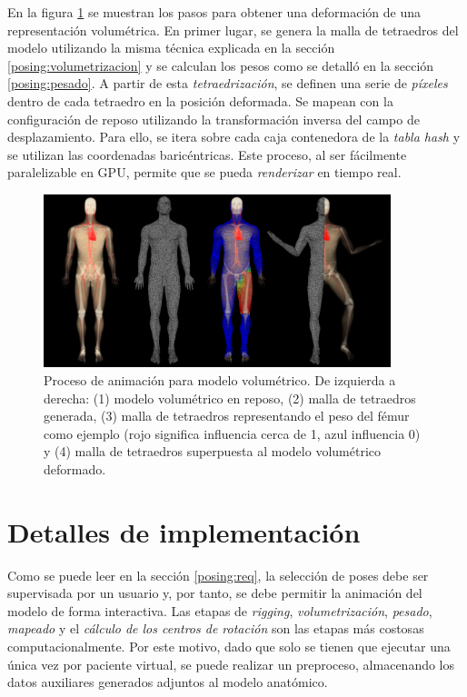 En la figura \ref{fig:volEx} se muestran los pasos para obtener una deformación de una representación volumétrica. En primer lugar, se genera la malla de tetraedros del modelo utilizando la misma técnica explicada en la sección \ref{posing:volumetrizacion}  y se calculan los pesos como se detalló en la sección \ref{posing:pesado}. A partir de esta \emph{tetraedrización}, se definen una serie de \emph{píxeles} dentro de cada tetraedro en la posición deformada. Se mapean con la configuración de reposo utilizando la transformación inversa del campo de desplazamiento. Para ello, se itera sobre cada caja contenedora de la \emph{\ac{tabla hash}} y se utilizan las coordenadas baricéntricas. Este proceso, al ser fácilmente paralelizable en \ac{GPU}, permite que se pueda \emph{renderizar} en tiempo real.


\begin{figure}[!ht]%
   \centering
   \includegraphics[width=0.90\textwidth]{IMG/Volumetric}
    \caption{Proceso de animación para modelo volumétrico. De izquierda a derecha: (1) modelo volumétrico en reposo, (2) malla de tetraedros generada, (3) malla de tetraedros representando el peso del fémur como ejemplo (rojo significa influencia cerca de 1, azul influencia 0) y (4) malla de tetraedros superpuesta al modelo volumétrico deformado. }
    \label{fig:volEx}
\end{figure}


\section{Detalles de implementación}
\label{posing:preprocess}

Como se puede leer en la sección \ref{posing:req}, la selección de poses debe ser supervisada por un usuario y, por tanto, se debe permitir la animación del modelo de forma interactiva. 
Las etapas de \emph{rigging}, \emph{volumetrización}, \emph{pesado}, \emph{mapeado} y el \emph{cálculo de los centros de rotación} son las etapas más costosas computacionalmente. 
Por este motivo, dado que solo se tienen que ejecutar una única vez por paciente virtual, se puede realizar un preproceso, almacenando los datos auxiliares generados adjuntos al modelo anatómico. 

